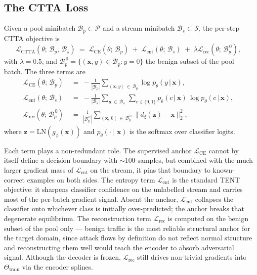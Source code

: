 \documentclass[10pt, conference, letterpaper]{IEEEtran}
\begin{document}
\subsection{The CTTA Loss}
\label{sec:loss}

Given a pool minibatch $\mathcal{B}_p \subset \mathcal{P}$ and a stream minibatch $\mathcal{B}_s \subset \mathcal{S}$, the per-step CTTA objective is
\begin{equation}
\label{eq:tta}
\mathcal{L}_{\text{CTTA}}\!\left(\theta;\, \mathcal{B}_p,\, \mathcal{B}_s\right) \;=\;  \mathcal{L}_{\text{CE}}\!\left(\theta;\, \mathcal{B}_p\right) \;+\;  \mathcal{L}_{\text{ent}}\!\left(\theta;\, \mathcal{B}_s\right) \;+\; \lambda \mathcal{L}_{\text{rec}}\!\left(\theta;\, \mathcal{B}_p^{\,0}\right),
\end{equation}
with $\lambda = 0.5$, and $\mathcal{B}_p^{\,0} = \{(\mathbf{x}, y) \in \mathcal{B}_p : y = 0\}$ the benign subset of the pool batch. The three terms are
\begin{align}
\label{eq:loss-ce}
\mathcal{L}_{\text{CE}}\!\left(\theta;\, \mathcal{B}_p\right) &\;=\; -\frac{1}{|\mathcal{B}_p|}\sum_{(\mathbf{x}, y) \,\in\, \mathcal{B}_p} \log p_\theta\!\left(y \,\big|\, \mathbf{x}\right), \\[2pt]
\label{eq:loss-ent}
\mathcal{L}_{\text{ent}}\!\left(\theta;\, \mathcal{B}_s\right) &\;=\; -\frac{1}{|\mathcal{B}_s|}\sum_{\mathbf{x} \,\in\, \mathcal{B}_s}\,\sum_{c \in \{0, 1\}} p_\theta\!\left(c \,\big|\, \mathbf{x}\right)\,\log p_\theta\!\left(c \,\big|\, \mathbf{x}\right), \\[2pt]
\label{eq:loss-rec}
\mathcal{L}_{\text{rec}}\!\left(\theta;\, \mathcal{B}_p^{\,0}\right) &\;=\; \frac{1}{|\mathcal{B}_p^{\,0}|}\sum_{(\mathbf{x},\, 0) \,\in\, \mathcal{B}_p^{\,0}} \big\| d_\xi\!\left(\mathbf{z}\right) - \mathbf{x} \big\|_2^2,
\end{align}
where $\mathbf{z} = \mathrm{LN}\!\left(g_\phi(\mathbf{x})\right)$ and $p_\theta(\cdot \mid \mathbf{x})$ is the softmax over classifier logits.

Each term plays a non-redundant role. The supervised anchor $\mathcal{L}_{\text{CE}}$ cannot by itself define a decision boundary with $\sim$100 samples, but combined with the much larger gradient mass of $\mathcal{L}_{\text{ent}}$ on the stream, it pins that boundary to known-correct examples on both sides. The entropy term $\mathcal{L}_{\text{ent}}$ is the standard TENT~\cite{wang2021tent} objective: it sharpens classifier confidence on the unlabelled stream and carries most of the per-batch gradient signal. Absent the anchor, $\mathcal{L}_{\text{ent}}$ collapses the classifier onto whichever class is initially over-predicted; the anchor breaks that degenerate equilibrium. The reconstruction term $\mathcal{L}_{\text{rec}}$ is computed on the benign subset of the pool only --- benign traffic is the most reliable structural anchor for the target domain, since attack flows by definition do not reflect normal structure and reconstructing them well would teach the encoder to absorb adversarial signal. Although the decoder is frozen, $\mathcal{L}_{\text{rec}}$ still drives non-trivial gradients into $\Theta_{\text{train}}$ via the encoder splines.
\end{document}
